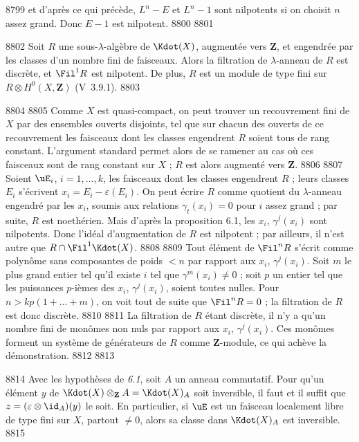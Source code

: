   8799	et d'apr\`es ce qui pr\'ec\`ede, $L^n - E$ et $L^n - 1$ sont nilpotents si on choisit $n$ assez grand. Donc $E - 1$ est nilpotent.
  8800	
  8801	\begin{proposition}[6.2]
  8802	Soit $R$ une sous-$\lambda$-alg\`ebre de $\Kdot(X)$, augment\'ee vers $\mathbf{Z}$, et engendr\'ee par les classes d'un nombre fini de faisceaux. Alors la filtration de $\lambda$-anneau de $R$ est discr\`ete, et $\Fil^1 R$ est nilpotent. De plus, $R$ est un module de type fini sur $R \otimes H^0(X,\mathbf{Z})$ (V~3.9.1).
  8803	\end{proposition}
  8804	
  8805	Comme $X$ est quasi-compact, on peut trouver un recouvrement fini de $X$ par des ensembles ouverts disjoints, tel que sur chacun des ouverts de ce recouvrement les faisceaux dont les classes engendrent $R$ soient tous de rang constant. L'argument standard permet alors de se ramener au cas o\`u ces faisceaux sont de rang constant sur $X$ ; $R$ est alors augment\'e vers $\mathbf{Z}$.
  8806	
  8807	Soient $\uE_i$, $i = 1,\dots,k$, les faisceaux dont les classes engendrent $R$ ; leurs classes $E_i$ s'\'ecrivent $x_i = E_i - \varepsilon(E_i)$. On peut \'ecrire $R$ comme quotient du $\lambda$-anneau engendr\'e par les $x_i$, soumis aux relations $\gamma_t(x_i) = 0$ pour $i$ assez grand ; par suite, $R$ est noeth\'erien. Mais d'apr\`es la proposition 6.1, les $x_i$, $\gamma^j(x_i)$ sont nilpotents. Donc l'id\'eal d'augmentation de $R$ est nilpotent ; par ailleurs, il n'est autre que $R \cap \Fil^1 \Kdot(X)$.
  8808	
  8809	Tout \'el\'ement de $\Fil^n R$ s'\'ecrit comme polyn\^ome sans composantes de poids $< n$ par rapport aux $x_i$, $\gamma^j(x_i)$. Soit $m$ le plus grand entier tel qu'il existe $i$ tel que $\gamma^m(x_i) \neq 0$ ; soit $p$ un entier tel que les puissances $p$-i\`emes des $x_i$, $\gamma^j(x_i)$, soient toutes nulles. Pour $n > kp(1 + \dots + m)$, on voit tout de suite que $\Fil^n R = 0$ ; la filtration de $R$ est donc discr\`ete.
  8810	
  8811	La filtration de $R$ \'etant discr\`ete, il n'y a qu'un nombre fini de mon\^omes non nuls par rapport aux $x_i$, $\gamma^j(x_i)$. Ces mon\^omes forment un syst\`eme de g\'en\'erateurs de $R$ comme $\mathbf{Z}$-module, ce qui ach\`eve la d\'emonstration.
  8812	
  8813	\begin{corollaire}[6.3]
  8814	Avec les hypoth\`eses de \emph{6.1}, soit $A$ un anneau commutatif. Pour qu'un \'el\'ement $y$ de $\Kdot(X) \otimes_{\mathbf{Z}} A = \Kdot(X)_A$ soit inversible, il faut et il suffit que $z = (\varepsilon \otimes \id_A)(y)$ le soit. En particulier, si $\uE$ est un faisceau localement libre de type fini sur $X$, partout $\neq 0$, alors sa classe dans $\Kdot(X)_A$ est inversible.
  8815	\end{corollaire}
